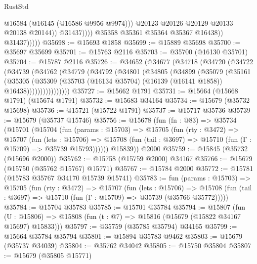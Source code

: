 \begin{lexlean}{RustStd}
\begin{coremodule}
                                @16584
                                (@16145 (@16586 @9956 @9974)))
                              @20123
                              @20126
                              @20129
                              @20133
                              @20138
                              @20144))
                          @31437))))
                  @35358
                  @35361
                  @35364
                  @35367
                  @16438))
              @31437)))))
@35698 := @15693 @1858
@35699 := @15889 @35698
@35700 := @35697 @35699
@35701 := @15763 @2116
@35703 := @35700 (@16130 @35701)
@35704 := @15787 @2116
@35726 := @34652
    (@34677
      (@34718
        (@34720
          (@34722
            (@34739
              (@34762
                (@34779
                  (@34792
                    (@34801
                      (@34805
                        (@34899
                          (@35079
                            (@35161
                              (@35305
                                (@35309
                                  (@35703
                                    (@16134 @35704)
                                    (@16139 (@16141 @1858))
                                    @16438))))))))))))))))
@35727 := @15662 @1791
@35731 := @15664 (@15668 @1791) (@15674 @1791)
@35732 := @15683 @34164
@35734 := @15679 (@35732 @15698)
@35736 := @15721 (@15722 @1791)
@35737 := @15717 @35736
@35739 := @15679 (@35737 @15746)
@35756 := @15678
    (fun (fn : @83) =>
    @35734
      (@15701
        (@15704
          (fun (params : @15703) =>
          @15705
            (fun (rty : @3472) =>
            @15707
              (fun (lets : @15706) =>
              @15708 (fun (tail : @3697) => @15710 (fun (Γ : @15709) => @35739 @15793))))))
        @15839))
    @2000
@35759 := @15845 (@35732 (@15696 @2000))
@35762 := @15758 (@15759 @2000) @34167
@35766 := @15679 (@15750 (@35762 @15767) @15771)
@35767 := @15784 @2000
@35772 := @15781 (@15783 @35767 @34170 @15739 @15741)
@35783 := fun (params : @15703) =>
  @15705
    (fun (rty : @3472) =>
    @15707
      (fun (lets : @15706) =>
      @15708 (fun (tail : @3697) => @15710 (fun (Γ : @15709) => @35739 (@35766 @35772)))))
@35784 := @15704 @35783
@35785 := @15701 @35784
@35794 := @15807
    (fun (U : @15806) => @15808 (fun (t : @7) => @15816 (@15679 (@15822 @34167 @15697) @15833)))
@35797 := @35759 (@35785 @35794) @34165
@35799 := @15664 @35784 @35794
@35801 := @15894 @35783 @9462
@35803 := @15679 (@35737 @34039)
@35804 := @35762 @34042
@35805 := @15750 @35804
@35807 := @15679 (@35805 @15771)

\end{coremodule}
\end{lexlean}
